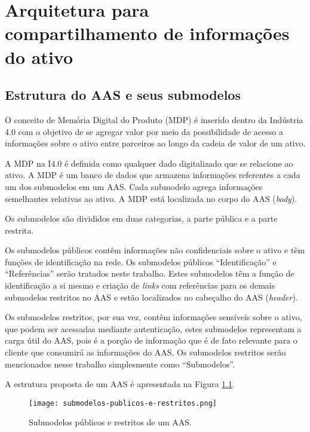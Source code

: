 \chapter{Arquitetura para compartilhamento de informações do ativo}


\section{Estrutura do AAS e seus submodelos}

	O conceito de Memória Digital do Produto (MDP) é inserido dentro da Indústria 4.0 com o objetivo de se agregar valor por meio da possibilidade de acesso a informações sobre o ativo entre parceiros ao longo da cadeia de valor de um ativo.
	
	A MDP na I4.0 é definida como qualquer dado digitalizado que se relacione ao ativo. A MDP é um banco de dados que armazena informações referentes a cada um dos submodelos em um AAS. Cada submodelo agrega informações semelhantes relativas ao ativo. A MDP está localizada no corpo do AAS (\textit{body}).
	
	Os submodelos são divididos em duas categorias, a parte pública e a parte restrita.
	
	Os submodelos públicos contêm informações não confidenciais sobre o ativo e têm funções de identificação na rede. Os submodelos públicos ``Identificação'' e ``Referências'' serão tratados neste trabalho. Estes submodelos têm a função de identificação a si mesmo e criação de \textit{links} com referências para os demais submodelos restritos no AAS e estão localizados no cabeçalho do AAS (\textit{header}).
	
	Os submodelos restritos, por sua vez, contêm informações sensíveis sobre o ativo, que podem ser acessadas mediante autenticação, estes submodelos representam a carga útil do AAS, pois é a porção de informação que é de fato relevante para o cliente que consumirá as informações do AAS. Os submodelos restritos serão mencionados nesse trabalho simplesmente como ``Submodelos''.
	
	A estrutura proposta de um AAS é apresentada na Figura \ref{fig:submodelos-publicos-e-restritos}.
	
	\begin{figure}[H]
		\centering
		\caption{Submodelos públicos e restritos de um AAS.}
		\texttt{[image: submodelos-publicos-e-restritos.png]}
		\label{fig:submodelos-publicos-e-restritos}
	\end{figure}

